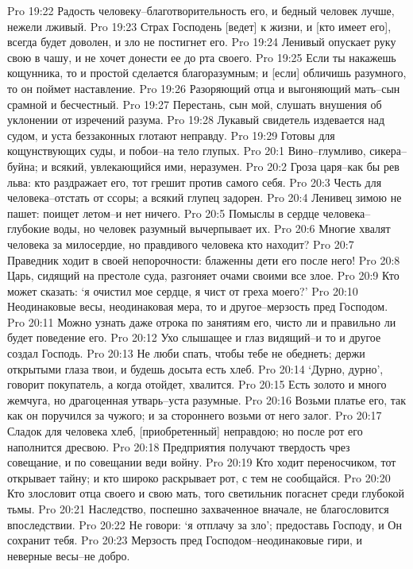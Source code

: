 Pro 19:22  Радость человеку--благотворительность его, и бедный человек лучше, нежели лживый.
Pro 19:23  Страх Господень [ведет] к жизни, и [кто имеет его], всегда будет доволен, и зло не постигнет его.
Pro 19:24  Ленивый опускает руку свою в чашу, и не хочет донести ее до рта своего.
Pro 19:25  Если ты накажешь кощунника, то и простой сделается благоразумным; и [если] обличишь разумного, то он поймет наставление.
Pro 19:26  Разоряющий отца и выгоняющий мать--сын срамной и бесчестный.
Pro 19:27  Перестань, сын мой, слушать внушения об уклонении от изречений разума.
Pro 19:28  Лукавый свидетель издевается над судом, и уста беззаконных глотают неправду.
Pro 19:29  Готовы для кощунствующих суды, и побои--на тело глупых.
Pro 20:1  Вино--глумливо, сикера--буйна; и всякий, увлекающийся ими, неразумен.
Pro 20:2  Гроза царя--как бы рев льва: кто раздражает его, тот грешит против самого себя.
Pro 20:3  Честь для человека--отстать от ссоры; а всякий глупец задорен.
Pro 20:4  Ленивец зимою не пашет: поищет летом--и нет ничего.
Pro 20:5  Помыслы в сердце человека--глубокие воды, но человек разумный вычерпывает их.
Pro 20:6  Многие хвалят человека за милосердие, но правдивого человека кто находит?
Pro 20:7  Праведник ходит в своей непорочности: блаженны дети его после него!
Pro 20:8  Царь, сидящий на престоле суда, разгоняет очами своими все злое.
Pro 20:9  Кто может сказать: `я очистил мое сердце, я чист от греха моего?'
Pro 20:10  Неодинаковые весы, неодинаковая мера, то и другое--мерзость пред Господом.
Pro 20:11  Можно узнать даже отрока по занятиям его, чисто ли и правильно ли будет поведение его.
Pro 20:12  Ухо слышащее и глаз видящий--и то и другое создал Господь.
Pro 20:13  Не люби спать, чтобы тебе не обеднеть; держи открытыми глаза твои, и будешь досыта есть хлеб.
Pro 20:14  `Дурно, дурно', говорит покупатель, а когда отойдет, хвалится.
Pro 20:15  Есть золото и много жемчуга, но драгоценная утварь--уста разумные.
Pro 20:16  Возьми платье его, так как он поручился за чужого; и за стороннего возьми от него залог.
Pro 20:17  Сладок для человека хлеб, [приобретенный] неправдою; но после рот его наполнится дресвою.
Pro 20:18  Предприятия получают твердость чрез совещание, и по совещании веди войну.
Pro 20:19  Кто ходит переносчиком, тот открывает тайну; и кто широко раскрывает рот, с тем не сообщайся.
Pro 20:20  Кто злословит отца своего и свою мать, того светильник погаснет среди глубокой тьмы.
Pro 20:21  Наследство, поспешно захваченное вначале, не благословится впоследствии.
Pro 20:22  Не говори: `я отплачу за зло'; предоставь Господу, и Он сохранит тебя.
Pro 20:23  Мерзость пред Господом--неодинаковые гири, и неверные весы--не добро.
